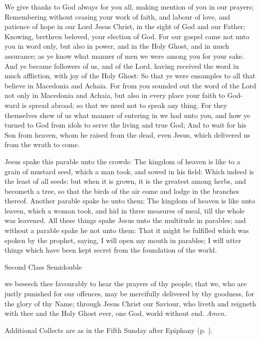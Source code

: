  We give thanks to God always for you all, making mention of you in our prayers; Remembering without ceasing your work of faith, and labour of love, and patience of hope in our Lord Jesus Christ, in the sight of God and our Father; Knowing, brethren beloved, your election of God. For our gospel came not unto you in word only, but also in power, and in the Holy Ghost, and in much assurance; as ye know what manner of men we were among you for your sake. And ye became followers of us, and of the Lord, having received the word in much affliction, with joy of the Holy Ghost: So that ye were ensamples to all that believe in Macedonia and Achaia. For from you sounded out the word of the Lord not only in Macedonia and Achaia, but also in every place your faith to God-ward is spread abroad; so that we need not to speak any thing. For they themselves shew of us what manner of entering in we had unto you, and how ye turned to God from idols to serve the living and true God; And to wait for his Son from heaven, whom he raised from the dead, even Jesus, which delivered us from the wrath to come.

 Jesus spake this parable unto the crowds: The kingdom of heaven is like to a grain of mustard seed, which a man took, and sowed in his field: Which indeed is the least of all seeds: but when it is grown, it is the greatest among herbs, and becometh a tree, so that the birds of the air come and lodge in the branches thereof. Another parable spake he unto them; The kingdom of heaven is like unto leaven, which a woman took, and hid in three measures of meal, till the whole was leavened. All these things spake Jesus unto the multitude in parables; and without a parable spake he not unto them: That it might be fulfilled which was spoken by the prophet, saying, I will open my mouth in parables; I will utter things which have been kept secret from the foundation of the world.


\begin{inhead}
{Second Class Semidouble}
\end{inhead}

\collect
{} we beseech thee favourably to hear the prayers of thy people; that we, who are justly punished for our offences, may be mercifully delivered by thy goodness, for the glory of thy Name; through Jesus Christ our Saviour, who liveth and reigneth with thee and the Holy Ghost ever, one God, world without end. \textit{Amen.}
\begin{rubric}
    Additional Collects are as in the Fifth Sunday after Epiphany (p. \pageref{EpiphanyV}).
\end{rubric}

